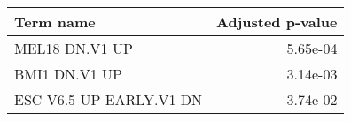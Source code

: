 \begin{tabular}{lr}
\toprule
              Term name &  Adjusted p-value \\
\midrule
         MEL18 DN.V1 UP &          5.65e-04 \\
          BMI1 DN.V1 UP &          3.14e-03 \\
ESC V6.5 UP EARLY.V1 DN &          3.74e-02 \\
\bottomrule
\end{tabular}
